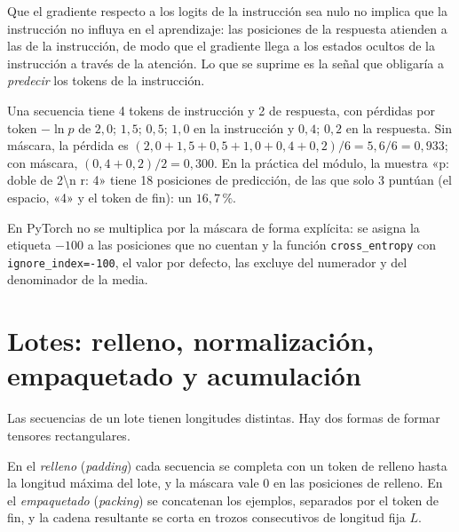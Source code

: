 \begin{observacion}
Que el gradiente respecto a los logits de la instrucción sea nulo no implica que la instrucción no influya en el aprendizaje: las posiciones de la respuesta atienden a las de la instrucción, de modo que el gradiente llega a los estados ocultos de la instrucción a través de la atención. Lo que se suprime es la señal que obligaría a \emph{predecir} los tokens de la instrucción.
\end{observacion}

\begin{ejemplo}\label{ej:mascara}
Una secuencia tiene 4 tokens de instrucción y 2 de respuesta, con pérdidas por token $-\ln p$ de $2{,}0$; $1{,}5$; $0{,}5$; $1{,}0$ en la instrucción y $0{,}4$; $0{,}2$ en la respuesta. Sin máscara, la pérdida es $(2{,}0+1{,}5+0{,}5+1{,}0+0{,}4+0{,}2)/6=5{,}6/6=0{,}933$; con máscara, $(0{,}4+0{,}2)/2=0{,}300$. En la práctica del módulo, la muestra «p: doble de 2\textbackslash n r: 4» tiene 18 posiciones de predicción, de las que solo 3 puntúan (el espacio, «4» y el token de fin): un $16{,}7\,\%$.
\end{ejemplo}

\begin{observacion}[Implementación]
En PyTorch no se multiplica por la máscara de forma explícita: se asigna la etiqueta $-100$ a las posiciones que no cuentan y la función \texttt{cross\_\allowbreak entropy} con \texttt{ignore\_index=-100}, el valor por defecto, las excluye del numerador y del denominador de la media.
\end{observacion}

\section{Lotes: relleno, normalización, empaquetado y acumulación}

Las secuencias de un lote tienen longitudes distintas. Hay dos formas de formar tensores rectangulares.

\begin{definicion}\label{def:relleno}
En el \emph{relleno} (\emph{padding}) cada secuencia se completa con un token de relleno hasta la longitud máxima del lote, y la máscara vale $0$ en las posiciones de relleno. En el \emph{empaquetado} (\emph{packing}) se concatenan los ejemplos, separados por el token de fin, y la cadena resultante se corta en trozos consecutivos de longitud fija $L$.
\end{definicion}

